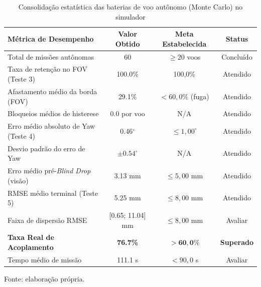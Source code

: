 \begin{table}[H]
    \centering
    \small
    \setlength{\tabcolsep}{6pt}
    \captionsetup{justification=centering}
    \caption{Consolidação estatística das baterias de voo autônomo (Monte Carlo) no simulador}
    \label{tab:consolidado_monte_carlo}
    \vspace{0.2cm}
    \begin{tabular}{lccc}
        \hline
        \textbf{Métrica de Desempenho} & \textbf{Valor Obtido} & \textbf{Meta Estabelecida} & \textbf{Status} \\
        \hline
        Total de missões autônomas & 60 & $\ge 20$ voos & Concluído \\
        Taxa de retenção no FOV (Teste 3) & 100.0\% & 100,0\% & Atendido \\
        Afastamento médio da borda (FOV) & 29.1\% & $< 60,0\%$ (fuga) & Atendido \\
        Bloqueios médios de histerese & 0.0 por voo & N/A & Atendido \\
        Erro médio absoluto de Yaw (Teste 4) & 0.46$^\circ$ & $\le 1,00^\circ$ & Atendido \\
        Desvio padrão do erro de Yaw & $\pm 0.54^\circ$ & N/A & Atendido \\
        Erro médio pré-\textit{Blind Drop} (visão) & 3.13 mm & $\le 5,00$ mm & Atendido \\
        RMSE médio terminal (Teste 5) & 5.25 mm & $\le 8,00$ mm & Atendido \\
        Faixa de dispersão RMSE & [0.65; 11.04] mm & $\le 8,00$ mm & Avaliar \\
        \textbf{Taxa Real de Acoplamento} & \textbf{76.7\%} & $\mathbf{> 60,0\%}$ & \textbf{Superado} \\
        Tempo médio de missão & 111.1 s & $< 90,0$ s & Avaliar \\
        \hline
    \end{tabular}
    \vspace{0.2cm}
    \begin{flushleft}
        \footnotesize Fonte: elaboração própria.
    \end{flushleft}
\end{table}
